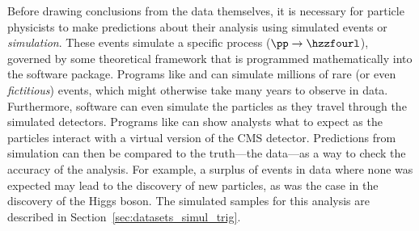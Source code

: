 Before drawing conclusions from the data themselves, it is necessary for particle physicists to make predictions about their analysis using simulated events or \emph{simulation}.
These events simulate a specific process (\eg $\pp \to \hzzfourl$), governed by some theoretical framework that is programmed mathematically into the software package.
Programs like \MGvATNLO and \POWHEG can simulate millions of rare (or even \emph{fictitious}) events, which might otherwise take many years to observe in data.
Furthermore, software can even simulate the particles as they travel through the simulated detectors.
Programs like \GEANTfour can show analysts what to expect as the particles interact with a virtual version of the CMS detector.
Predictions from simulation can then be compared to the truth---the data---as a way to check the accuracy of the analysis.
For example, a surplus of events in data where none was expected may lead to the discovery of new particles, as was the case in the discovery of the Higgs boson.
The simulated samples for this analysis are described in Section~\ref{sec:datasets_simul_trig}.

